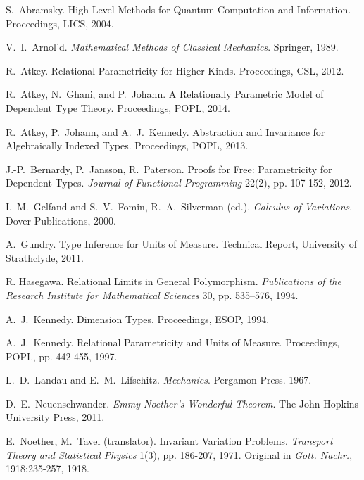 \documentclass{sigplanconf}
\theoremstyle{examplestyle}
\begin{document}
\begin{thebibliography}{12}
\softraggedright

S.~Abramsky. High-Level Methods for Quantum Computation and Information.
Proceedings, LICS, 2004.

 V.~I.~Arnol'd. {\em Mathematical Methods of
  Classical Mechanics}. Springer, 1989.

R.~Atkey. Relational Parametricity for Higher Kinds.
Proceedings, CSL, 2012.

 R.~Atkey, N.~Ghani, and P.~Johann. A
  Relationally Parametric Model of Dependent Type Theory. Proceedings,
  POPL, 2014.

R.~Atkey, P.~Johann, and A.~J.~Kennedy. Abstraction and Invariance for Algebraically Indexed Types.
Proceedings, POPL, 2013.

J.-P.~Bernardy, P.~Jansson, R.~Paterson.
Proofs for Free: Parametricity for Dependent Types.
{\em Journal of Functional Programming} 22(2), pp. 107-152, 2012.

 I.~M.~Gelfand and S.~V.~Fomin,
  R.~A.~Silverman (ed.). {\em Calculus of Variations}. Dover Publications,
  2000.

 A.~Gundry. Type Inference for Units of
  Measure. Technical Report, University of Strathclyde, 2011.

 R. Hasegawa.  Relational Limits in
  General Polymorphism.  {\em Publications of the Research Institute
    for Mathematical Sciences} 30, pp. 535--576, 1994.

A.~J.~Kennedy. Dimension Types.
Proceedings, ESOP, 1994.

A.~J.~Kennedy. Relational Parametricity and Units of Measure.
Proceedings, POPL, pp. 442-455, 1997.

 L.~D.~Landau and
  E.~M.~Lifschitz. {\em Mechanics}. Pergamon Press. 1967.

D.~E.~Neuenschwander. {\em Emmy Noether's Wonderful Theorem}.
The John Hopkins University Press, 2011.

 E.~Noether, M.~Tavel (translator). Invariant
  Variation Problems.  {\em Transport Theory and Statistical Physics}
  1(3), pp. 186-207, 1971. Original in {\em Gott. Nachr.},
  1918:235-257, 1918.


\end{thebibliography}
\end{document}
